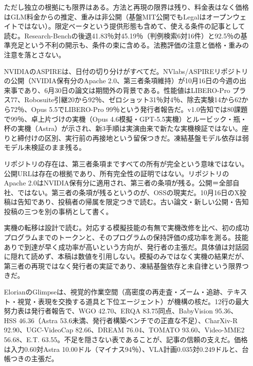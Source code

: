 \documentclass[lualatex,a4paper,10pt]{jlreq}
\begin{document}
ただし独立の根拠にも限界はある。方法と再現の限界は残り、料金表はなく価格はGLM料金からの推定、重みは非公開（基盤MIT公開でもLegalはオープンウェイトではない）。限定ベータという提供形態も含めて、使える条件の記事として読む。Research-Benchの後退41.83％対45.19％（判例検索6対16件）と92.5％の基準充足という不利の開示も、条件の束に含める。法務評価の注意と価格・重みの注意を落とさない。
\cite{B55,B53,B54}




NVIDIAのASPIREは、日付の切り分けがすべてだ。NVlabs/ASPIREリポジトリの公開（NVIDIA保有分のApache 2.0、第三者条項維持）が10月16日の今週の出来事であり、6月30日の論文は期間外の背景である。性能値はLIBERO-Pro プラス77、Robosuite引継20から92％、ゼロショット31％対4％、除去実験14から62から72％、Opus 5.5でLIBERO-Pro 99％という発行者報告だ。v1.0告知では80課題で99％、卓上片づけの実機（Opus 4.6模擬・GPT-5.5実機）とルービック・瓶・杯の実機（Astra）が示され、新3手順は実演由来で新たな実機検証ではない。座りと締付けの区別、実行前の再接地という留保つきだ。凍結基盤モデル依存は弱モデル未検証のまま残る。
\cite{B57,B56,B89}


リポジトリの存在は、第三者条項まですべての所有が完全という意味ではない。公開URLは存在の根拠であり、所有完全性の証明ではない。リポジトリのApache 2.0はNVIDIA保有分に適用され、第三者の条項が残る。公開＝全部自社、ではない。第三者の条項が残るというのが、OSSの現実だ。10月16日のX投稿は告知であり、投稿者の帰属を限定つきで読む。古い論文・新しい公開・告知投稿の三つを別の事柄として書く。
\cite{B57,B56}


実機の転移は設計で読む。対応する模擬技能の有無で実機改修を比べ、初の成功プログラムまでのトークンと、そのプログラムの保持評価の成功率を測る。技能ありで到達が早く成功率が高いという方向が、発行者の主張だ。具体値は対話図に隠れて読めず、本稿は数値を引用しない。模擬のみではなく実機の結果だが、第三者の再現ではなく発行者の実証であり、凍結基盤依存と未自律という限界つきだ。
\cite{B57,B56,B89}


ElorianのGlimpseは、視覚的作業空間（高密度の再走査・ズーム・追跡、テキスト・視覚・表現を交換する道具と下位エージェント）が機構の核だ。12行の最大努力表は発行者報告で、WGO 42.70、ERQA 83.75同点、BabyVision 95.36、HSS 46.36（Astra 53.6未満、発行者構築ベンチでの正直な不足）、CharXiv-R 92.90、UGC-VideoCap 82.66、DREAM 76.04、TOMATO 93.60、Video-MME2 56.68、E.T. 63.55。不足を隠さない表であることが、記事の信頼の支えだ。価格は入力0.60対Astra 10.00ドル（マイナス94％）、VLA計画0.035対0.249ドルと、台帳つきの主張だ。
\cite{B58,B59,B88}
\end{document}
